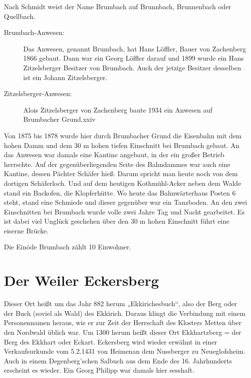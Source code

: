 \documentclass[12pt,a4pager]{book}
\begin{document}
Nach Schmidt weist der Name Brumbach auf Brunnbach, Brunnenbach oder Quellbach.

\begin{description}
\item[Brumbach-Anwesen:] Das Anwesen, genannt Brumbach, hat Hans Löffler, Bauer
von Zachenberg 1866 gebaut. Dann war ein Georg Löffler darauf und 1899 wurde ein
Hans Zitzelsberger Besitzer von Brumbach. Auch der jetzige Besitzer desselben
ist ein Johann Zitzelsberger.

\item[Zitzelsberger-Anwesen:] Alois Zitzelsberger von Zachenberg baute 1934 ein
Anwesen auf Brumbacher Grund.xxiv
\end{description}

Von 1875 bis 1878 wurde hier durch Brumbacher Grund die Eisenbahn mit dem hohen
Damm und dem 30 m hohen tiefen Einschnitt bei Brumbach gebaut. An das Anwesen
war damals eine Kantine angebaut, in der ein großer Betrieb herrschte. Auf der
gegenüberliegenden Seite des Bahndammes war auch eine Kantine, dessen Pächter
Schäfer hieß. Darum spricht man heute noch von dem dortigen Schäferloch. Und auf
dem heutigen Kothmühl-Acker neben dem Walde stand ein Backofen, die
Klopferhütte. Wo heute das Bahnwärterhaus Posten 6 steht, stand eine Schmiede
und dieser gegenüber war ein Tanzboden. An den zwei Einschnitten bei Brumbach
wurde volle zwei Jahre Tag und Nacht gearbeitet. Es ist dabei viel Unglück
geschehen über den 30 m hohen Einschnitt führt eine eiserne Brücke.

Die Einöde Brumbach zählt 10 Einwohner.

\section{Der Weiler Eckersberg}

Dieser Ort heißt um das Jahr 882 herum „Ekkirichesbuch“, also der Berg oder der
Buch (soviel als Wald) des Ekkirich. Daraus klingt die Verbindung mit einem
Personennamen heraus, wie er zur Zeit der Herrschaft des Klosters Metten über
den Nordwald üblich war. Um 1300 herum heißt dieser Ort Ekkhartzberg = der Berg
des Ekkhart oder Eckart. Eckersberg wird wieder erwähnt in einer Verkaufsurkunde
vom 5.2.1431 von Heimenan dem Nussberger zu Neueglofsheim. Auch in einem
Degenberg'schen Salbuch aus dem Ende des 16. Jahrhunderts erscheint es wieder.
Ein Georg Philipp war damals hier sesshaft.
\end{document}
